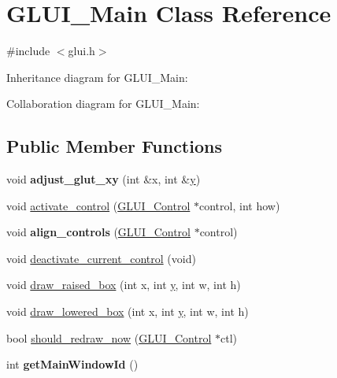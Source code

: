\hypertarget{class_g_l_u_i___main}{\section{G\+L\+U\+I\+\_\+\+Main Class Reference}
\label{class_g_l_u_i___main}
}


{\ttfamily \#include $<$glui.\+h$>$}



Inheritance diagram for G\+L\+U\+I\+\_\+\+Main\+:


Collaboration diagram for G\+L\+U\+I\+\_\+\+Main\+:
\subsection*{Public Member Functions}
\begin{DoxyCompactItemize}
\item 
\hypertarget{class_g_l_u_i___main_a8489a73dc673357da03075fb1decfc21}{void {\bfseries adjust\+\_\+glut\+\_\+xy} (int \&x, int \&\hyperlink{_ice_utils_8h_aa7ffaed69623192258fb8679569ff9ba}{y})}\label{class_g_l_u_i___main_a8489a73dc673357da03075fb1decfc21}

\item 
void \hyperlink{class_g_l_u_i___main_aafe506d2f17957f0ff81b7168d12428a}{activate\+\_\+control} (\hyperlink{class_g_l_u_i___control}{G\+L\+U\+I\+\_\+\+Control} $\ast$control, int how)
\item 
\hypertarget{class_g_l_u_i___main_a9a01bc045bb6689df3778a199fc68d51}{void {\bfseries align\+\_\+controls} (\hyperlink{class_g_l_u_i___control}{G\+L\+U\+I\+\_\+\+Control} $\ast$control)}\label{class_g_l_u_i___main_a9a01bc045bb6689df3778a199fc68d51}

\item 
void \hyperlink{class_g_l_u_i___main_a819a4700253582ef4a49101c25b3a5a3}{deactivate\+\_\+current\+\_\+control} (void)
\item 
void \hyperlink{class_g_l_u_i___main_a45cae7de3682226f44ab74d7afd44063}{draw\+\_\+raised\+\_\+box} (int x, int \hyperlink{_ice_utils_8h_aa7ffaed69623192258fb8679569ff9ba}{y}, int w, int h)
\item 
void \hyperlink{class_g_l_u_i___main_acbd304f272403767b0bcf610bd14cc05}{draw\+\_\+lowered\+\_\+box} (int x, int \hyperlink{_ice_utils_8h_aa7ffaed69623192258fb8679569ff9ba}{y}, int w, int h)
\item 
bool \hyperlink{class_g_l_u_i___main_a838a093d3748a6a6434f5e3a62d29c79}{should\+\_\+redraw\+\_\+now} (\hyperlink{class_g_l_u_i___control}{G\+L\+U\+I\+\_\+\+Control} $\ast$ctl)
\item 
\hypertarget{class_g_l_u_i___main_aa396142fea73ecc40c002658193d7ee0}{int {\bfseries get\+Main\+Window\+Id} ()}\label{class_g_l_u_i___main_aa396142fea73ecc40c002658193d7ee0}


\end{DoxyCompactItemize}
